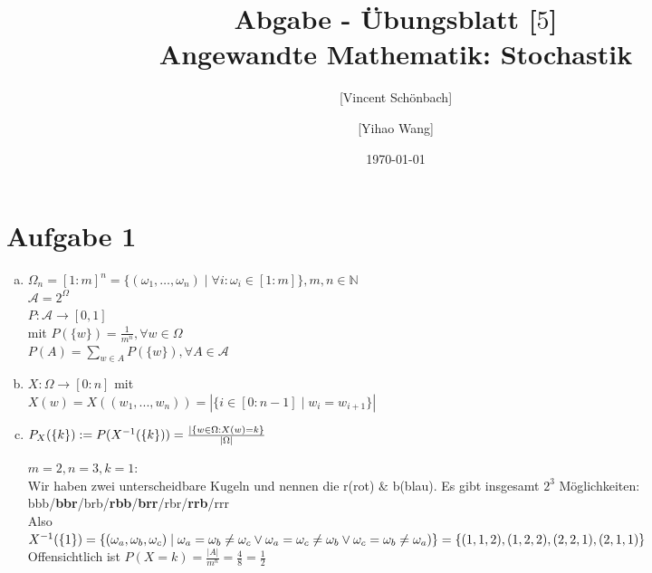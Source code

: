 \documentclass[10pt,a4paper]{article}
\begin{document}
\title{Abgabe - Übungsblatt [$5$]\\
\small{Angewandte Mathematik: Stochastik}}
\author{ [Vincent Schönbach] \and [Yihao Wang]}
\date{\today}
\maketitle

\section*{Aufgabe 1}
\begin{enumerate}[a)]
 \item $\Omega_n = [1:m]^n = \{(\omega_1, \ldots, \omega_n) \mid \forall i: \omega_i \in [1:m]\}, m, n \in \mathbb{N}$\\
 $\mathcal{A} = 2^\Omega$\\
 $P:\mathcal{A} \rightarrow [0,1]$\\
 mit $P(\{w\}) = \frac{1}{m^n},\forall w\in\Omega$\\
 $P(A) = \sum_{w\in A}P(\{w\}),\forall A \in \mathcal{A}$\\
 \item 
 $X:\Omega \rightarrow [0:n]$ mit\\
 $X(w) = X((w_1,...,w_n)) = |\{i\in[0:n-1] \mid w_i = w_{i+1}\}|$
 \item
 $P_X(\{k\}) := P(X^{-1}(\{k\}))\\
 =\frac{|\{w\in\Omega : X(w)=k\}}{|\Omega|}$
 
 $m=2, n=3, k=1$:\\
 Wir haben zwei unterscheidbare Kugeln und nennen die r(rot) $\&$ b(blau).
 Es gibt insgesamt $2^3$ Möglichkeiten: bbb/\textbf{bbr}/brb/\textbf{rbb}/\textbf{brr}/rbr/\textbf{rrb}/rrr\\
 Also \\ $X^{-1}(\{1\}) = \{(\omega_a,\omega_b,\omega_c) \mid \omega_a = \omega_b \neq \omega_c \lor  \omega_a = \omega_c \neq \omega_b \lor  \omega_c = \omega_b \neq \omega_a)\}\\
 = \{(1, 1, 2), (1,2,2), (2,2,1), (2,1,1)\}$\\
 Offensichtlich ist $P(X=k) = \frac{|A|}{m^n} = \frac{4}{8} = \frac{1}{2}$\\
 
\end{enumerate}


\newpage
\end{document}
